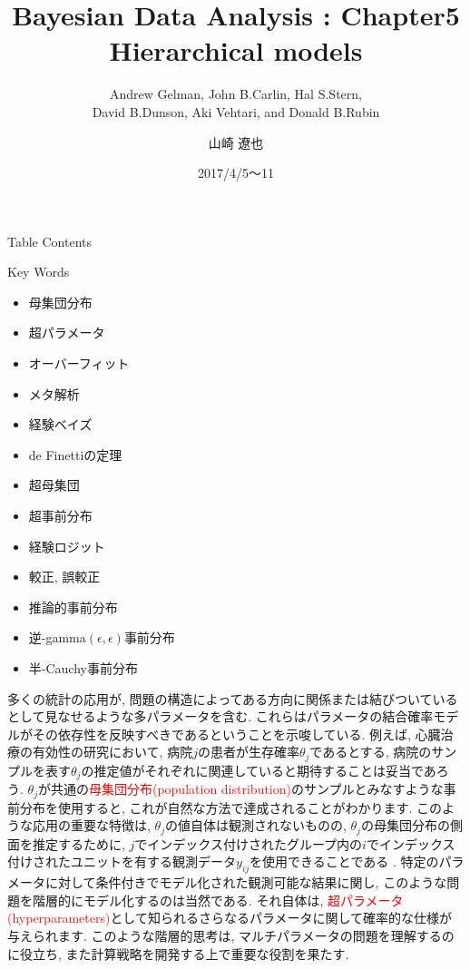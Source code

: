 \documentclass[10pt,dvipdfmx,a4]{beamer}
\title{Bayesian Data Analysis : Chapter5 \\Hierarchical models}
\subtitle{Andrew Gelman, John B.Carlin, Hal S.Stern,\\David B.Dunson, Aki Vehtari, and Donald B.Rubin}
\author{山崎 遼也}
\institute{情報学科 数理工学コース 4回}
\date{2017/4/5～11}
\newcommand{\tcr}[1]{\textcolor{red}{#1}}
\begin{document}
\frame{\titlepage}

\begin{frame}{Table Contents}
\begin{multicols}{2}
{\scriptsize \tableofcontents}
\end{multicols}
\end{frame}

\begin{frame}{Key Words}
\begin{multicols}{2}
{\scriptsize \begin{itemize}
\item 母集団分布
\item 超パラメータ
\item オーバーフィット
\item メタ解析
\item 経験ベイズ
\item de Finettiの定理
\item 超母集団
\item 超事前分布
\item 経験ロジット
\item 較正, 誤較正
\item 推論的事前分布
\item 逆-gamma$(\epsilon,\epsilon)$事前分布
\item 半-Cauchy事前分布
\end{itemize}}
\end{multicols}
\end{frame}


\begin{frame}
多くの統計の応用が, 問題の構造によってある方向に関係または結びついているとして見なせるような多パラメータを含む.
これらはパラメータの結合確率モデルがその依存性を反映すべきであるということを示唆している.
例えば, 心臓治療の有効性の研究において, 病院$j$の患者が生存確率$\theta_j$であるとする, 病院のサンプルを表す$\theta_j$の推定値がそれぞれに関連していると期待することは妥当であろう.
$\theta_j$が共通の\tcr{母集団分布(population distribution)}のサンプルとみなすような事前分布を使用すると, これが自然な方法で達成されることがわかります.
このような応用の重要な特徴は, $\theta_j$の値自体は観測されないものの, $\theta_j$の母集団分布の側面を推定するために, $j$でインデックス付けされたグループ内の$i$でインデックス付けされたユニットを有する観測データ$y_{ij}$を使用できることである .
特定のパラメータに対して条件付きでモデル化された観測可能な結果に関し, このような問題を階層的にモデル化するのは当然である.
それ自体は, \tcr{超パラメータ(hyperparameters)}として知られるさらなるパラメータに関して確率的な仕様が与えられます.
このような階層的思考は, マルチパラメータの問題を理解するのに役立ち, また計算戦略を開発する上で重要な役割を果たす.
\end{frame}
\end{document}
